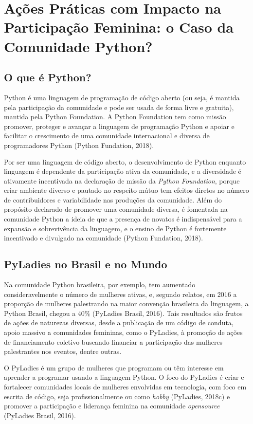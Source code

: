 \section{Ações Práticas com Impacto na Participação Feminina: o Caso da Comunidade Python?}
\subsection{O que é Python?}

Python é uma linguagem de programação de código aberto (ou seja, é mantida pela participação da comunidade e pode ser usada de forma livre e gratuita), mantida pela Python Foundation. A Python Foundation tem como missão promover, proteger e avançar a linguagem de programação Python e apoiar e facilitar o crescimento de uma comunidade internacional e diversa de programadores Python (Python Fundation, 2018).

Por ser uma linguagem de código aberto, o desenvolvimento de Python enquanto linguagem é dependente da participação ativa da comunidade, e a diversidade é ativamente incentivada na declaração de missão da \textit{Python Foundation}, porque criar ambiente diverso e pautado no respeito mútuo tem efeitos diretos no número de contribuidores e variabilidade nas produções da comunidade. Além do propósito declarado de promover uma comunidade diversa, é fomentada na comunidade Python a ideia de que a presença de novatos é indispensável para a expansão e sobrevivência da linguagem, e o ensino de Python é fortemente incentivado e divulgado na comunidade (Python Fundation, 2018).

\subsection{PyLadies no Brasil e no Mundo}

Na comunidade Python brasileira, por exemplo, tem aumentado consideravelmente o número de mulheres ativas, e, segundo relatos, em 2016 a proporção de mulheres palestrando na maior convenção brasileira da linguagem, a Python Brasil, chegou a 40\% (PyLadies Brasil, 2016). Tais resultados são frutos de ações de naturezas diversas, desde a publicação de um código de conduta, apoio massivo a comunidades femininas, como o PyLadies, à promoção de ações de financiamento coletivo buscando financiar a participação das mulheres palestrantes nos eventos, dentre outras.

O PyLadies é um grupo de mulheres que programam ou têm interesse em aprender a programar usando a linguagem Python. O foco do PyLadies é criar e fortalecer comunidades locais de mulheres envolvidas em tecnologia, com foco em escrita de código, seja profissionalmente ou como \textit{hobby} (PyLadies, 2018c) e promover a participação e liderança feminina na comunidade \textit{opensource} (PyLadies Brasil, 2016).

